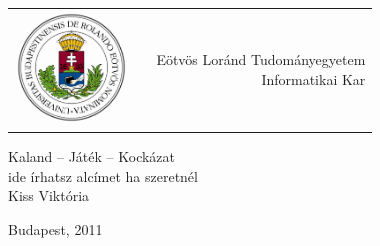 \begin{titlepage}

\begin{tabular}{p{1in}p{0.8in}r}
\parbox{3cm}{\includegraphics[height=30mm]{eltecimer}} & & 
\parbox{7.0cm}{
  Eötvös Loránd Tudományegyetem \\
  Informatikai Kar}
\\[6.0cm]
\end{tabular}

\begin{center}
{\Huge Kaland -- Játék -- Kockázat }\\ [0.3cm]
{\Large ide írhatsz alcímet ha szeretnél} \\ [0.5cm]
{\Large Kiss Viktória}
\end{center}
\vfill{\large Budapest, 2011}

\end{titlepage}
